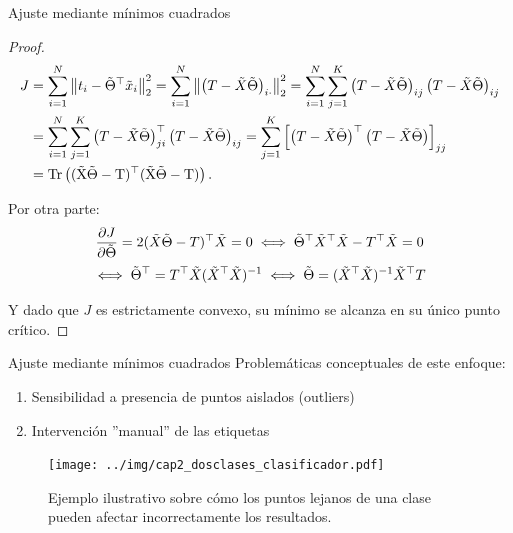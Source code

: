 \documentclass[9pt]{beamer}
\begin{document}
\begin{frame}{Ajuste mediante mínimos cuadrados}

\begin{proof}
\begin{align*}
  J &= \sum_{i=1}^N \norm{t_i - \tilde{\Theta}^\top\tx_i}_2^2 = \sum_{i=1}^N \norm{\left(T - \tX\tilde{\Theta}\right)_{i\cdot}}_2^2 = \sum_{i=1}^N \sum_{j=1}^K \left(T - \tX\tilde{\Theta}\right)_{ij} \left(T - \tX\tilde{\Theta}\right)_{ij}\\
  &= \sum_{i=1}^N \sum_{j=1}^K \left(T - \tX\tilde{\Theta}\right)^\top_{ji} \left(T - \tX\tilde{\Theta}\right)_{ij} =  \sum_{j=1}^K \left[\left(T - \tX\tilde{\Theta}\right)^\top \left(T - \tX\tilde{\Theta}\right)\right]_{jj}\\
  &=\operatorfont{Tr} \left((\tX\tilde{\Theta}-T)^\top (\tX\tilde{\Theta}-T)\right).
\end{align*}
  
Por otra parte:
\begin{equation*}
  \frac{\partial J}{\partial\tilde{\Theta}} = 2(\tilde{X}\tilde{\Theta}-T)^\top\tilde{X}=0 \iff \tilde{\Theta}^\top\tilde{X}^\top\tilde{X} - T^\top\tilde{X} = 0 
\end{equation*}
\begin{equation*}
\iff \tilde{\Theta}^\top = T^\top\tilde{X}(\tilde{X}^\top\tilde{X})^{-1}\iff \tilde{\Theta} = (\tilde{X}^\top\tilde{X})^{-1}\tilde{X}^\top T
\end{equation*}
  
Y dado que $J$ es estrictamente convexo, su mínimo se alcanza en su único punto crítico.  

\end{proof}


\end{frame}

\begin{frame}{Ajuste mediante mínimos cuadrados}
Problemáticas conceptuales de este enfoque: 
\begin{enumerate}
  \item Sensibilidad a presencia de puntos aislados (outliers) \pause
  \item Intervención ''manual'' de las etiquetas \pause
\end{enumerate}
\begin{figure}[H]
  \centering
  \texttt{[image: ../img/cap2\_dosclases\_clasificador.pdf]}\\
  \caption{Ejemplo ilustrativo sobre cómo los puntos lejanos de una clase pueden afectar incorrectamente los resultados.}
  \label{fig:clasif_mse}
\end{figure}


\end{frame}
\end{document}
